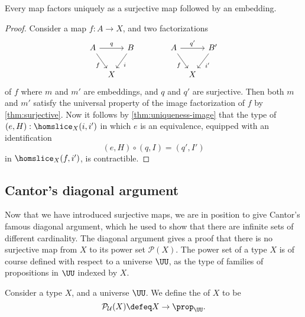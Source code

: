 \begin{cor}
  Every map factors uniquely as a surjective map followed by an embedding.
\end{cor}

\begin{proof}
  Consider a map $f:A\to X$, and two factorizations
  \begin{equation*}
    \begin{tikzcd}[column sep=tiny]
      A \arrow[rr,"q"] \arrow[dr,swap,"f"] & & B \arrow[dl,"i"] &[3em] A \arrow[rr,"{q'}"] \arrow[dr,swap,"f"] & & B' \arrow[dl,"{i'}"] \\
      & X & & & X
    \end{tikzcd}
  \end{equation*}
  of $f$ where $m$ and $m'$ are embeddings, and $q$ and $q'$ are surjective. Then both $m$ and $m'$ satisfy the universal property of the image factorization of $f$ by \cref{thm:surjective}. Now it follows by \cref{thm:uniqueness-image} that the type of $(e,H):\homslice_X(i,i')$ in which $e$ is an equivalence, equipped with an identification
  \begin{equation*}
    (e,H)\circ(q,I)=(q',I')
  \end{equation*}
  in $\homslice_X(f,i')$, is contractible.
\end{proof}

\subsection{Cantor's diagonal argument}

Now that we have introduced surjective maps, we are in position to give Cantor's famous diagonal argument, which he used to show that there are infinite sets of different cardinality. The diagonal argument gives a proof that there is no surjective map from $X$ to its power set $\mathcal{P}(X)$. The power set of a type $X$ is of course defined with respect to a universe $\UU$, as the type of families of propositions in $\UU$ indexed by $X$.

\begin{defn}
  Consider a type $X$, and a universe $\UU$. We define the  of $X$ to be
  \begin{equation*}
    \mathcal{P}_{\mathcal{U}}(X)\defeq X\to\prop_\UU.
  \end{equation*}
\end{defn}

